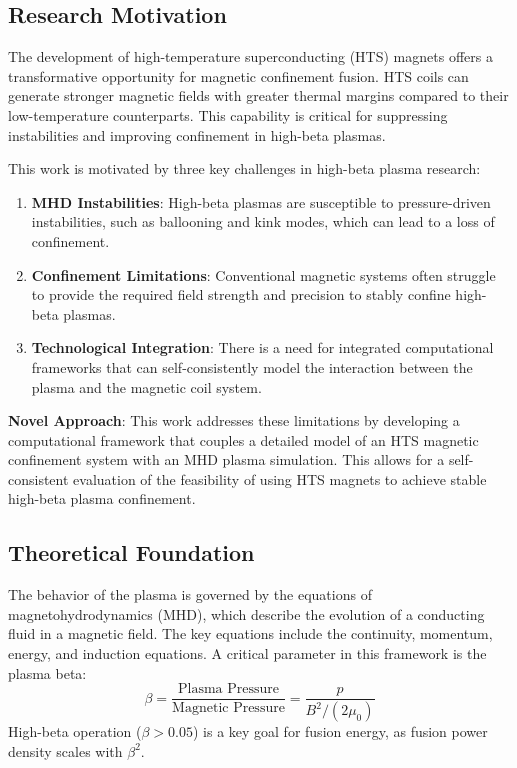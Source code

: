 \documentclass[10pt,twocolumn]{article}
\begin{document}
\subsection{Research Motivation}

The development of high-temperature superconducting (HTS) magnets offers a transformative opportunity for magnetic confinement fusion. HTS coils can generate stronger magnetic fields with greater thermal margins compared to their low-temperature counterparts. This capability is critical for suppressing instabilities and improving confinement in high-beta plasmas.

This work is motivated by three key challenges in high-beta plasma research:
\begin{enumerate}
\item \textbf{MHD Instabilities}: High-beta plasmas are susceptible to pressure-driven instabilities, such as ballooning and kink modes, which can lead to a loss of confinement.
\item \textbf{Confinement Limitations}: Conventional magnetic systems often struggle to provide the required field strength and precision to stably confine high-beta plasmas.
\item \textbf{Technological Integration}: There is a need for integrated computational frameworks that can self-consistently model the interaction between the plasma and the magnetic coil system.
\end{enumerate}

\textbf{Novel Approach}: This work addresses these limitations by developing a computational framework that couples a detailed model of an HTS magnetic confinement system with an MHD plasma simulation. This allows for a self-consistent evaluation of the feasibility of using HTS magnets to achieve stable high-beta plasma confinement.

\subsection{Theoretical Foundation}

The behavior of the plasma is governed by the equations of magnetohydrodynamics (MHD), which describe the evolution of a conducting fluid in a magnetic field. The key equations include the continuity, momentum, energy, and induction equations. A critical parameter in this framework is the plasma beta:
\begin{equation}
\beta = \frac{\text{Plasma Pressure}}{\text{Magnetic Pressure}} = \frac{p}{B^2 / (2\mu_0)}
\end{equation}
High-beta operation ($\beta > 0.05$) is a key goal for fusion energy, as fusion power density scales with $\beta^2$.
\end{document}
